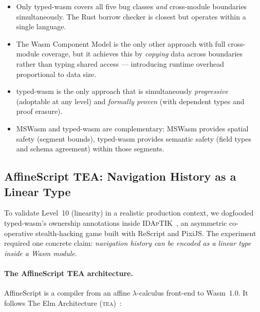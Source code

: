 \documentclass[sigplan,nonacm,screen]{acmart}
\begin{document}
\begin{itemize}
  \item Only typed-wasm covers all five bug classes \emph{and} cross-module
    boundaries simultaneously.  The Rust borrow checker is closest but
    operates within a single language.

  \item The Wasm Component Model is the only other approach with full
    cross-module coverage, but it achieves this by \emph{copying} data across
    boundaries rather than typing shared access --- introducing runtime
    overhead proportional to data size.

  \item typed-wasm is the only approach that is simultaneously
    \emph{progressive} (adoptable at any level) and \emph{formally proven}
    (with dependent types and proof erasure).

  \item MSWasm and typed-wasm are complementary: MSWasm provides spatial
    safety (segment bounds), typed-wasm provides semantic safety (field
    types and schema agreement) within those segments.
\end{itemize}

\subsection{AffineScript TEA: Navigation History as a Linear Type}
\label{sec:affinescript-tea}


To validate Level~10 (linearity) in a realistic production context, we
dogfooded typed-wasm's ownership annotations inside
\textsc{IDApTIK}~\cite{idaptik2026}, an asymmetric co-operative
stealth-hacking game built with ReScript and PixiJS.  The experiment
required one concrete claim: \emph{navigation history can be encoded as a
linear type inside a Wasm module}.

\paragraph{The AffineScript TEA architecture.}
AffineScript is a compiler from an affine $\lambda$-calculus front-end to
Wasm~1.0.  It follows The Elm Architecture (\textsc{tea})~\cite{elm2016}:
\end{document}
